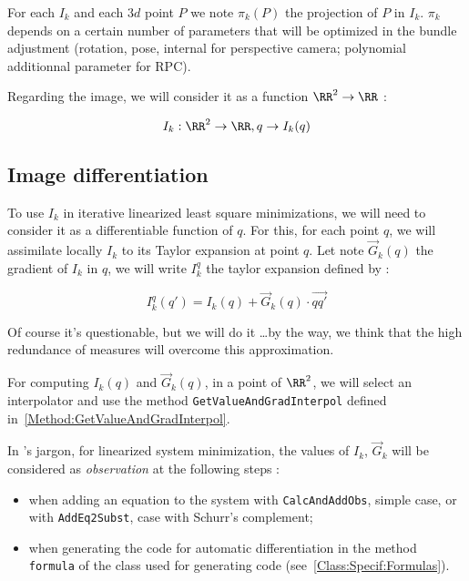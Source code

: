 For each $I_k$ and each $3d$ point $P$ we note  $\pi_k(P)$ the projection of 
$P$ in $I_k$. $\pi_k$ depends on a certain number of parameters that will
be optimized in the bundle adjustment (rotation, pose, internal for perspective
camera; polynomial additionnal parameter for RPC).

Regarding the image, we will consider it as a function $\RR^2 \rightarrow  \RR$ :

\begin{equation}
    I_k : \RR^2 \rightarrow  \RR  ,  q    \rightarrow  I_k(q) 
\end{equation}


\subsection{Image differentiation}

To use $I_k$ in iterative linearized least square minimizations,  we will need
to consider it as a differentiable function of $q$.  For this, for each point $q$,
we will assimilate locally $I_k$ to its Taylor expansion at point $q$. Let
note  $\vec G_k(q)$ the gradient of $I_k$ in $q$, we will write $I^q_k$ the
taylor expansion defined by :

\begin{equation}
   I^q_k(q') = I_k(q) + \vec G_k(q) \cdot  \overrightarrow{q q'} 
\end{equation}

Of course it's questionable, but we will do it \dots by the way, we think that the  high
redundance of measures will overcome this approximation.

For computing $I_k(q)$ and $\vec G_k(q)$, in a point of $\RR^2$,
we will select an interpolator and use the method {\tt GetValueAndGradInterpol}
defined in~\ref{Method:GetValueAndGradInterpol}.

In \PPP's jargon, for linearized system minimization, the values of $I_k$, $\vec G_k$   will be considered as \emph{observation} 
at the following steps :

\begin{itemize}
   \item  when adding an equation to the system with {\tt CalcAndAddObs}, simple case,
          or with {\tt AddEq2Subst}, case with Schurr's complement;
          
   \item  when generating the code for automatic differentiation in the method {\tt formula}
          of the class used for generating code (see~\ref{Class:Specif:Formulas}).
\end{itemize}

